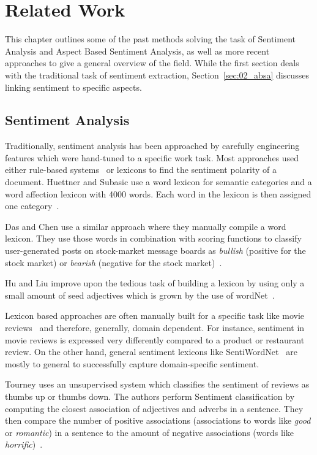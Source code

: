 \chapter{Related Work}
\label{ch:relWork}

This chapter outlines some of the past methods solving the task of Sentiment Analysis and Aspect Based Sentiment Analysis, as well as more recent approaches to give a general overview of the field. While the first section deals with the traditional task of sentiment extraction, Section~\ref{sec:02_absa} discusses linking sentiment to specific aspects.

\section{Sentiment Analysis}

Traditionally, sentiment analysis has been approached by carefully engineering features which were hand-tuned to a specific work task. Most approaches used either rule-based systems~\cite{Popescu2005} or lexicons to find the sentiment polarity of a document. Huettner and Subasic use a word lexicon for semantic categories and a word affection lexicon with 4000 words. Each word in the lexicon is then assigned one category~\cite{Huettner2000}. 

Das and Chen use a similar approach where they manually compile a word lexicon. They use those words in combination with scoring functions to classify user-generated posts on stock-market message boards as \textit{bullish} {(positive for the stock market)} or \textit{bearish} {(negative for the stock market)}~\cite{Das2007}.

Hu and Liu improve upon the tedious task of building a lexicon by using only a small amount of seed adjectives which is grown by the use of wordNet~\cite{Hu2004}.
\medskip

Lexicon based approaches are often manually built for a specific task like movie reviews~\cite{Tong2001, Thet2010} and therefore, generally, domain dependent. For instance, sentiment in movie reviews is expressed very differently compared to a product or restaurant review. On the other hand, general sentiment lexicons like SentiWordNet~\cite{Baccianella2010} are mostly to general to successfully capture domain-specific sentiment.
\medskip

Tourney uses an unsupervised system which classifies the sentiment of reviews as thumbs up or thumbs down. The authors perform Sentiment classification by computing the closest association of adjectives and adverbs in a sentence. They then compare the number of positive associations {(associations to words like \textit{good} or \textit{romantic})} in a sentence to the amount of negative associations {(words like \textit{horrific})}~\cite{Turney2007}.
\medskip

